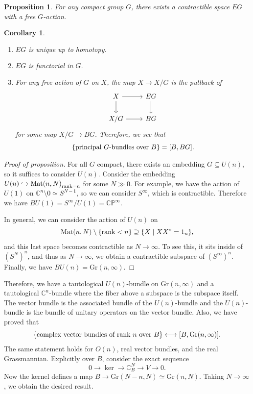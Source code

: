 \documentclass[leqno, openany]{memoir}
\newtheorem{cor}[thm]{Corollary}
\newtheorem{prop}[thm]{Proposition}
\theoremstyle{definition}
\theoremstyle{remark}
\theoremstyle{plain}
\theoremstyle{definition}
\theoremstyle{remark}
\newcommand{\C}{\mathbb{C}}
\renewcommand{\P}{\mathbb{P}}
\newcommand{\mr}[1]{\mathrm{#1}}
\begin{document}
\begin{prop}
    For any compact group $G$, there exists a contractible space $EG$ with a free $G$-action.
\end{prop}

\begin{cor}\leavevmode
    \begin{enumerate}
        \item $EG$ is unique up to homotopy.
        \item $EG$ is functorial in $G$.
        \item For any free action of $G$ on $X$, the map $X \to X/G$ is the pullback of
            \begin{equation*}
            \begin{tikzcd}
                X \ar{r} \ar{d} & EG \ar{d} \\
                X/G \ar{r} & BG
            \end{tikzcd}
            \end{equation*}
            for some map $X/G \to BG$. Therefore, we see that
            \[ \qty{\text{principal $G$-bundles over $B$}} = [B, BG]. \]
    \end{enumerate}
\end{cor}

\begin{proof}[Proof of proposition]
    For all $G$ compact, there exists an embedding $G \subseteq U(n)$, so it suffices to consider $U(n)$. Consider the embedding $U(n) \hookrightarrow { \mr{Mat}(n, N) }_{\rank = n}$ for some $N \gg 0$. For example, we have the action of $U(1)$ on $\C^n \setminus 0 \simeq S^{N-1}$, so we can consider $S^{\infty}$, which is contractible. Therefore we have $BU(1) = S^{\infty} / U(1) = \C\P^{\infty}$.

    In general, we can consider the action of $U(n)$ on 
    \[ \mr{Mat}(n, N) \setminus \qty{\rank < n} \supseteq \qty{X \mid XX^* = 1_n}, \]
    and this last space becomes contractible as $N \to \infty$. To see this, it sits inside of ${(S^N)}^n$, and thus as $N \to \infty$, we obtain a contractible subspace of ${(S^{\infty})}^n$. Finally, we have $BU(n) = \mr{Gr}(n, \infty)$. 
\end{proof}

Therefore, we have a tautological $U(n)$-bundle on $\mr{Gr}(n, \infty)$ and a tautological $\C^n$-bundle where the fiber above a subspace is the subspace itself. The vector bundle is the associated bundle of the $U(n)$-bundle and the $U(n)$-bundle is the bundle of unitary operators on the vector bundle. Also, we have proved that
\[ \qty{\text{complex vector bundles of rank $n$ over $B$}} \longleftrightarrow [B, \mr{Gr}(n, \infty)]. \]
The same statement holds for $O(n)$, real vector bundles, and the real Grassmannian. Explicitly over $B$, consider the exact sequence
\[ 0 \to \ker \to \C^N_B \to V \to 0. \]
Now the kernel defines a map $B \to \mr{Gr}(N - n, N) \simeq \mr{Gr}(n, N)$. Taking $N \to \infty$, we obtain the desired result.
\end{document}
